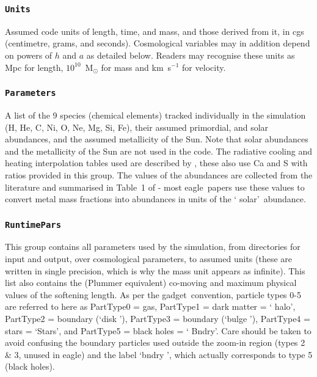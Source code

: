 \documentclass[10pt, a4paper]{article}
\newcommand{\eagle}{{\sc eagle}}
\newcommand{\gadget}{{\sc gadget}}
\begin{document}
\subsubsection{\texttt{Units}}
Assumed code units of length, time, and mass, and those derived from it, in cgs
(centimetre, grams, and seconds). Cosmological variables may in addition
depend on powers of $h$ and $a$ as detailed below. Readers may recognise these
units as Mpc for length, $10^{10}$~M$_\odot$ for mass and km~s$^{-1}$ for
velocity.

\subsubsection{\texttt{Parameters}} A list of the 9 species (chemical elements)
tracked individually in the simulation (H, He, C, Ni, O, Ne, Mg, Si, Fe), their
assumed primordial, and solar abundances, and the assumed metallicity of the
Sun. Note that solar abundances and the metallicity of the Sun are not used in
the code. The radiative cooling and heating interpolation tables used are
described by \cite{Wiersma09a}, these also use Ca and S with ratios provided in
this group. The values of the abundances are collected from the literature and
summarised in Table~1 of \cite{Wiersma09a} - most \eagle\ papers use these
values to convert metal mass fractions into abundances in units of the \lq
solar\rq\ abundance.

\subsubsection{\texttt{RuntimePars}}
This group contains all parameters used by the simulation, from directories for
input and output, over cosmological parameters, to assumed units (these are
written in single precision, which is why the mass unit appears as infinite).
This list also contains the (Plummer equivalent) co-moving and maximum physical
values of the softening length. As per the \gadget\ convention, particle types
0-5 are referred to here as PartType0 = gas, PartType1 = dark matter = \lq
halo\rq, PartType2 = boundary (\lq disk \rq), PartType3 = boundary (\lq bulge \rq), PartType4 = stars = \lq Stars\rq, and PartType5 = black holes = \lq
Bndry\rq. Care should be taken to avoid confusing the boundary particles used
outside the zoom-in region (types 2 \& 3, unused in \eagle) and the label \lq bndry \rq,
which actually corresponds to type 5 (black holes).
\end{document}

